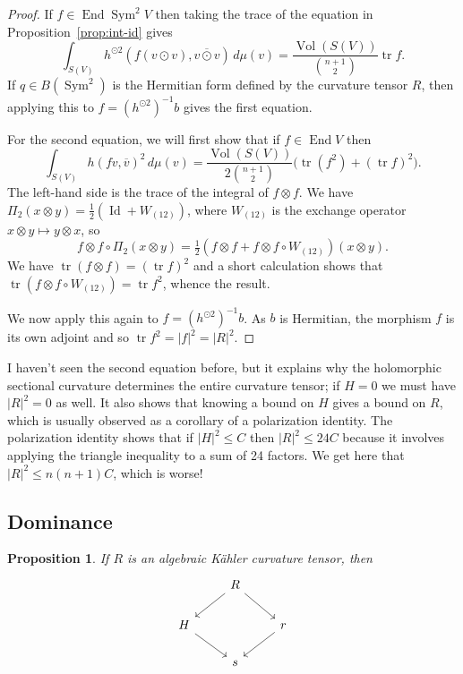 \documentclass[10pt,a4paper]{amsart}
\newtheorem{prop}[theo]{Proposition}
\theoremstyle{definition}
\def\ov#1{\overline{#1}}
\DeclareMathOperator{\Sym}{Sym}
\DeclareMathOperator{\id}{Id}
\DeclareMathOperator{\tr}{tr}
\DeclareMathOperator{\Vol}{Vol}
\DeclareMathOperator{\End}{End}
\begin{document}
\begin{proof}
If $f \in \End \Sym^2 V$ then taking the trace of the equation in
Proposition~\ref{prop:int-id} gives
$$
\int_{S(V)} h^{\odot 2}(f(v \odot v), \ov{v \odot v}) \, d\mu(v)
= \frac{\Vol(S(V))}{\binom{n+1}{2}} \tr f.
$$
If $q \in B(\Sym^2)$ is the Hermitian form defined by the curvature tensor $R$,
then applying this to $f = (h^{\odot 2})^{-1} b$ gives the first equation.

For the second equation,
we will first show that if $f \in \End V$ then
$$
\int_{S(V)} h(fv, \ov v)^2 \, d\mu(v)
= \frac{\Vol(S(V))}{2\binom{n+1}{2}}
\bigl( \tr(f^2) + (\tr f)^2 \bigr).
$$
The left-hand side is the trace of the integral of $f \otimes f$.
We have $\Pi_2(x \otimes y) = \frac12(\id + W_{(12)})$,
where $W_{(12)}$ is the exchange operator $x \otimes y \mapsto y \otimes x$,
so
$$
f \otimes f \circ \Pi_2 (x \otimes y)
= \tfrac12 (f\otimes f + f\otimes f \circ W_{(12)}) (x \otimes y).
$$
We have $\tr (f \otimes f) = (\tr f)^2$ and a short calculation shows that
$\tr (f \otimes f \circ W_{(12)}) = \tr f^2$, whence the result.

We now apply this again to $f = (h^{\odot 2})^{-1} b$. As $b$ is Hermitian,
the morphism $f$ is its own adjoint and so $\tr f^2 = |f|^2 = |R|^2$.
\end{proof}


I haven't seen the second equation before, but it explains why the holomorphic
sectional curvature determines the entire curvature tensor; if $H = 0$ we must
have $|R|^2 = 0$ as well.
It also shows that knowing a bound on $H$ gives a bound on $R$, which is
usually observed as a corollary of a polarization identity.
The polarization identity shows that if $|H|^2 \leq C$ then $|R|^2 \leq
24 C$ because it involves applying the triangle inequality to a sum of 24 factors.
We get here that $|R|^2 \leq n(n+1)C$, which is worse!


\subsection*{Dominance}


\begin{prop}
If $R$ is an algebraic K\"ahler curvature tensor, then
$$
\begin{tikzcd}
& R \ar[dl] \ar[dr] &
\\
H \ar[dr] & & r \ar[dl]
\\
& s &
\end{tikzcd}
$$
\end{prop}
\end{document}
